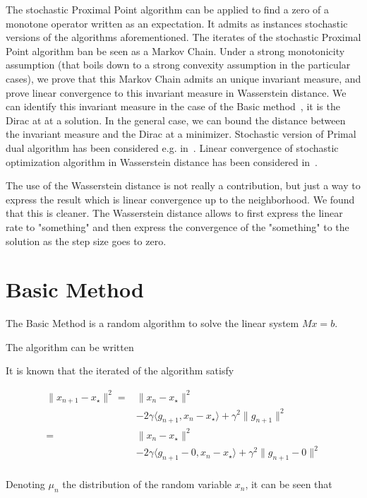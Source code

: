 \documentclass{article}
\newcommand{\1}{\mathbbm 1}
\newcommand{\ps}[1]{\langle #1 \rangle}
\newcommand{\asnote}[1]{\todo[color=green!20]{#1}}
\theoremstyle{definition}
\begin{document}
The stochastic Proximal Point algorithm can be applied to find a zero of a monotone operator written as an expectation. It admits as instances stochastic versions of the algorithms aforementioned. The iterates of the stochastic Proximal Point algorithm ban be seen as a Markov Chain. Under a strong monotonicity assumption (that boils down to a strong convexity assumption in the particular cases), we prove that this Markov Chain admits an unique invariant measure, and prove linear convergence to this invariant measure in Wasserstein distance. We can identify this invariant measure in the case of the Basic method~\cite{richtarik2017stochastic}, it is the Dirac at at a solution. In the general case, we can bound the distance between the invariant measure and the Dirac at a minimizer. 
Stochastic version of Primal dual algorithm has been considered e.g. in~\cite{chambolle2018stochastic}. Linear convergence of stochastic optimization algorithm in Wasserstein distance has been considered in~\cite{dieuleveut2017bridging,can2019accelerated}. 


The use of the Wasserstein distance is not really a contribution, but just a way to express the result which is linear convergence up to the neighborhood. We found that this is cleaner. The Wasserstein distance allows to first express the linear rate to "something" and then express the convergence of the "something" to the solution as the step size goes to zero. 

\section{Basic Method}

The Basic Method is a random algorithm to solve the linear system $M x = b$. 

The algorithm can be written

It is known that the iterated of the algorithm satisfy

\begin{align*}
    \|x_{n+1} - x_\star\|^2 =& \|x_{n} - x_\star\|^2 \\
    &- 2\gamma\ps{g_{n+1},x_n - x_\star} + \gamma^2\|g_{n+1}\|^2\\
    =& \|x_{n} - x_\star\|^2 \\
    &- 2\gamma\ps{g_{n+1} - 0,x_n - x_\star} + \gamma^2\|g_{n+1} - 0\|^2\\
\end{align*}

Denoting $\mu_n$ the distribution of the random variable $x_n$, it can be seen that\asnote{to complete}
\end{document}
